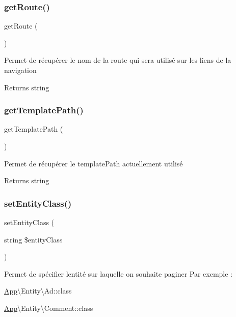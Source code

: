 \subsubsection{\texorpdfstring{getRoute()}{getRoute()}}
{\footnotesize\ttfamily get\+Route (\begin{DoxyParamCaption}{ }\end{DoxyParamCaption})}

Permet de récupérer le nom de la route qui sera utilisé sur les liens de la navigation

\begin{DoxyReturn}{Returns}
string 
\end{DoxyReturn}
\mbox{\label{class_app_1_1_service_1_1_pagination_service_a4faced39e5a4a69805a7d3121b191ad1}} 
\subsubsection{\texorpdfstring{getTemplatePath()}{getTemplatePath()}}
{\footnotesize\ttfamily get\+Template\+Path (\begin{DoxyParamCaption}{ }\end{DoxyParamCaption})}

Permet de récupérer le template\+Path actuellement utilisé

\begin{DoxyReturn}{Returns}
string 
\end{DoxyReturn}
\mbox{\label{class_app_1_1_service_1_1_pagination_service_a52860badb20cab10adff381d94c20b97}} 
\subsubsection{\texorpdfstring{setEntityClass()}{setEntityClass()}}
{\footnotesize\ttfamily set\+Entity\+Class (\begin{DoxyParamCaption}\item[{string}]{\$entity\+Class }\end{DoxyParamCaption})}

Permet de spécifier l\textquotesingle{}entité sur laquelle on souhaite paginer Par exemple \+:
\begin{DoxyItemize}
\item \mbox{\hyperlink{namespace_app}{App}}\textbackslash{}\+Entity\textbackslash{}\+Ad\+::class
\item \mbox{\hyperlink{namespace_app}{App}}\textbackslash{}\+Entity\textbackslash{}\+Comment\+::class
\end{DoxyItemize}


